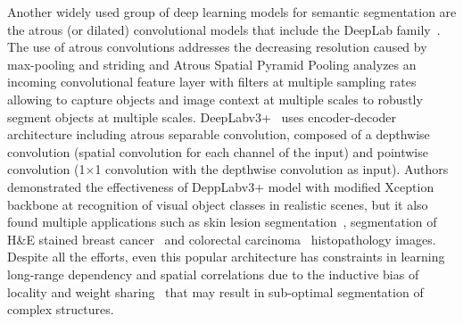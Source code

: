 Another widely used group of deep learning models for semantic segmentation are the atrous (or dilated) convolutional models that include the DeepLab family~\cite{chen2017deeplab, chen2017rethinking}. The use of atrous convolutions addresses the decreasing resolution caused by max-pooling and striding and Atrous Spatial Pyramid Pooling analyzes an incoming convolutional feature layer with filters at multiple sampling rates allowing to capture objects and image context at multiple scales to robustly segment objects at multiple scales. DeepLabv3+~\cite{chen2018encoder} uses encoder-decoder architecture including atrous separable convolution, composed of a depthwise convolution (spatial convolution for each channel of the input) and pointwise convolution (1$\times$1 convolution with the depthwise convolution as input). Authors~\cite{chen2018encoder} demonstrated the effectiveness of DeppLabv3+ model with modified Xception backbone at recognition of visual object classes in realistic scenes, but it also found multiple applications such as skin lesion segmentation~\cite{azad2020attention}, segmentation of H\&E stained breast cancer~\cite{priego2020automatic} and colorectal carcinoma~\cite{xu2022spatial} histopathology images. Despite all the efforts, even this popular architecture has constraints in learning long-range dependency and spatial correlations due to the inductive bias of locality and weight sharing~\cite{xie2021cotr} that may result in sub-optimal segmentation of complex structures. 

